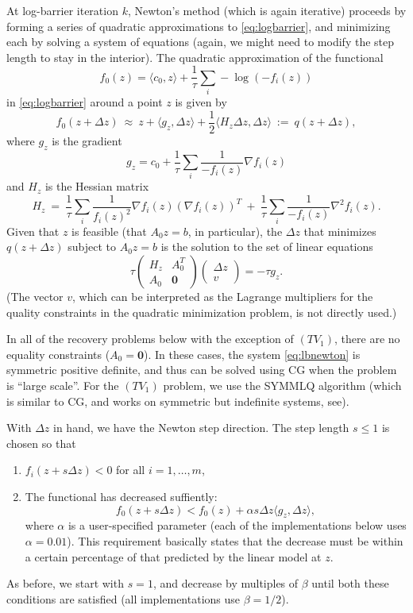 \documentclass{article}
\newcommand{\bpm}{\left(\begin{matrix}}
\newcommand{\epm}{\end{matrix}\right)}
\newcommand{\grad}{\nabla}
\newcommand{\dz}{\Delta z}
\newcommand{\<}{\langle}
\renewcommand{\>}{\rangle}
\newcommand{\vzero}{\mathbf{0}}
\begin{document}
At log-barrier iteration $k$, Newton's method (which is again iterative) proceeds by forming a series of quadratic approximations to \eqref{eq:logbarrier}, and minimizing each by solving a system of equations (again, we might need to modify the step length to stay in the interior).  The quadratic approximation of the functional 
\[
f_0(z) = \<c_0,z\> + \frac{1}{\tau}\sum_i -\log(-f_i(z))
\]
in \eqref{eq:logbarrier} around a point $z$ is given by
\[
f_0(z+\dz) ~\approx~ z + \<g_z,\dz\> + \frac{1}{2}\<H_z \dz,\dz\> ~:=~ q(z+\dz),
\]
where $g_z$ is the gradient
\[
g_z = c_0 + \frac{1}{\tau}\sum_i \frac{1}{-f_i(z)}\grad f_i(z)
\]
and $H_z$ is the Hessian matrix
\[
H_z ~=~ \frac{1}{\tau}\sum_i \frac{1}{f_i(z)^2} \grad f_i(z) (\grad f_i(z))^T ~+ ~
\frac{1}{\tau}\sum_i \frac{1}{-f_i(z)}\grad^2 f_i(z).
\]
Given that $z$ is feasible (that $A_0 z=b$, in particular), the $\dz$ that minimizes $q(z+\dz)$ subject to $A_0 z=b$ is the solution to the set of linear equations
\begin{equation}
\label{eq:lbnewton}
\tau \bpm H_z & A_0^T \\ A_0 & \vzero \epm \bpm \dz \\ v \epm= -\tau g_z.
\end{equation}
(The vector $v$, which can be interpreted as the Lagrange multipliers for the quality constraints in the quadratic minimization problem, is not directly used.)

In all of the recovery problems below with the exception of $(TV_1)$, there are no equality constraints ($A_0=\vzero$).  In these cases, the system \eqref{eq:lbnewton} is symmetric positive definite, and thus can be solved using CG when the problem is ``large scale''.  For the $(TV_1)$ problem, we use the SYMMLQ algorithm (which is similar to CG, and works on symmetric but indefinite systems, see\cite{paige75so}). 

With $\dz$ in hand, we have the Newton step direction.  The step length $s\leq 1$ is chosen so that 
\begin{enumerate}
%
\item $f_i(z+s\dz) < 0$ for all $i=1,\ldots,m$,
%
\item The functional has decreased suffiently:
\[
f_0(z+s\dz) < f_0(z) + \alpha s\dz \<g_z,\dz\>,
\]
where $\alpha$ is a user-specified parameter (each of the implementations below uses $\alpha=0.01$).  This requirement basically states that the decrease must be within a certain percentage of that predicted by the linear model at $z$.
%
\end{enumerate}
As before, we start with $s=1$, and decrease by multiples of $\beta$ until both these conditions are satisfied (all implementations use $\beta = 1/2$).
\end{document}
